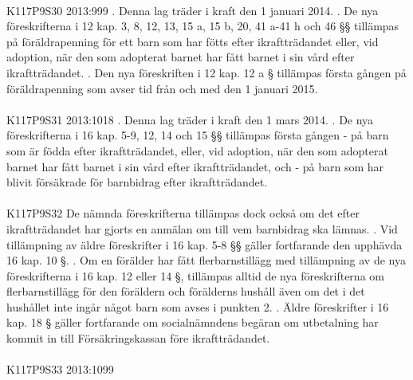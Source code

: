 \documentclass[a4paper,notitlepage,openany,10pt]{book}
\begin{document}
\paragraph*{}
{\tiny K117P9S30}
2013:999
. Denna lag träder i kraft den 1 januari 2014.
. De nya föreskrifterna i 12 kap. 3, 8, 12, 13, 15 a, 15 b, 20, 41 a-41 h och 46 §§ tillämpas på föräldrapenning för ett barn som har fötts efter ikraftträdandet eller, vid adoption, när den som adopterat barnet har fått barnet i sin vård efter ikraftträdandet.
. Den nya föreskriften i 12 kap. 12 a § tillämpas första gången på föräldrapenning som avser tid från och med den 1 januari 2015.
\paragraph*{}
{\tiny K117P9S31}
2013:1018
. Denna lag träder i kraft den 1 mars 2014.
. De nya föreskrifterna i 16 kap. 5-9, 12, 14 och 15 §§ tillämpas första gången
\newline - på barn som är födda efter ikraftträdandet, eller, vid adoption, när den som adopterat barnet har fått barnet i sin vård efter ikraftträdandet, och
\newline - på barn som har blivit försäkrade för barnbidrag efter ikraftträdandet.
\paragraph*{}
{\tiny K117P9S32}
De nämnda föreskrifterna tillämpas dock också om det efter ikraftträdandet har gjorts en anmälan om till vem barnbidrag ska lämnas.
. Vid tillämpning av äldre föreskrifter i 16 kap. 5-8 §§ gäller fortfarande den upphävda 16 kap. 10 §.
. Om en förälder har fått flerbarnstillägg med tillämpning av de nya föreskrifterna i 16 kap. 12 eller 14 §, tillämpas alltid de nya föreskrifterna om flerbarnstillägg för den föräldern och förälderns hushåll även om det i det hushållet inte ingår något barn som avses i punkten 2.
. Äldre föreskrifter i 16 kap. 18 § gäller fortfarande om socialnämndens begäran om utbetalning har kommit in till Försäkringskassan före ikraftträdandet.
\paragraph*{}
{\tiny K117P9S33}
2013:1099
\end{document}
